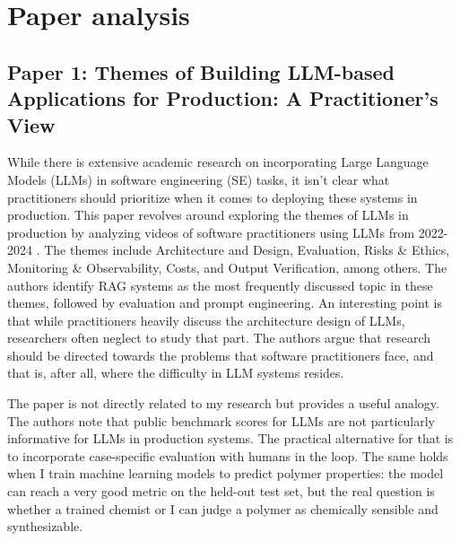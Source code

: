 \documentclass[11pt,a4paper]{article}
\begin{document}
\section{Paper analysis}

\subsection*{Paper 1: Themes of Building LLM-based Applications for Production: A Practitioner’s View}

While there is extensive academic research on incorporating Large Language Models (LLMs) in software engineering (SE) tasks, it isn't clear what practitioners should prioritize when it comes to deploying these systems in production. This paper revolves around exploring the themes of LLMs in production by analyzing videos of software practitioners using LLMs from 2022-2024 \cite{themes_llms}. The themes include Architecture and Design, Evaluation, Risks \& Ethics, Monitoring \& Observability, Costs, and Output Verification, among others. The authors identify RAG systems as the most frequently discussed topic in these themes, followed by evaluation and prompt engineering. An interesting point is that while practitioners heavily discuss the architecture design of LLMs, researchers often neglect to study that part. The authors argue that research should be directed towards the problems that software practitioners face, and that is, after all, where the difficulty in LLM systems resides. 

The paper is not directly related to my research but provides a useful analogy. The authors note that public benchmark scores for LLMs are not particularly informative for LLMs in production systems. The practical alternative for that is to incorporate case-specific evaluation with humans in the loop. The same holds when I train machine learning models to predict polymer properties: the model can reach a very good metric on the held-out test set, but the real question is whether a trained chemist or I can judge a polymer as chemically sensible and synthesizable.

\end{document}
